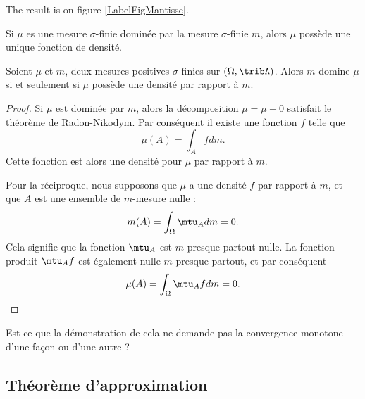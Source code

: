 The result is on figure \ref{LabelFigMantisse}. %
\newcommand{\CaptionFigMantisse}{<+Type your caption here+>}


\begin{corollary}   \label{CorZDkhwS}
    Si \( \mu\) es une mesure \( \sigma\)-finie dominée par la mesure \( \sigma\)-finie \( m\), alors \( \mu\) possède une unique fonction de densité.
\end{corollary}

\begin{corollary}       \label{CorDomDens}
    Soient \( \mu\) et \( m\), deux mesures positives \( \sigma\)-finies sur \( (\Omega,\tribA)\). Alors \( m\) domine \( \mu\) si et seulement si \( \mu\) possède une densité par rapport à \( m\).
\end{corollary}
 
\begin{proof}
    Si \( \mu\) est dominée par \( m\), alors la décomposition \( \mu=\mu+0\) satisfait le théorème de Radon-Nikodym. Par conséquent il existe une fonction \( f\) telle que
    \begin{equation}
        \mu(A)=\int_Afdm.
    \end{equation}
    Cette fonction est alors une densité pour \( \mu\) par rapport à \( m\).

    Pour la réciproque, nous supposons que \( \mu\) a une densité \( f\) par rapport à \( m\), et que \( A\) est une ensemble de \( m\)-mesure nulle :
    \begin{equation}
        m(A)=\int_{\Omega}\mtu_Adm=0.
    \end{equation}
    Cela signifie que la fonction \( \mtu_A\) est \( m\)-presque partout nulle. La fonction produit \( \mtu_Af\) est également nulle \( m\)-presque partout, et par conséquent
    \begin{equation}
        \mu(A)=\int_{\Omega}\mtu_Afdm=0.
    \end{equation}
\end{proof}

\begin{probleme}
    Est-ce que la démonstration de cela ne demande pas la convergence monotone d'une façon ou d'une autre ?
\end{probleme}

\subsection{Théorème d'approximation}

